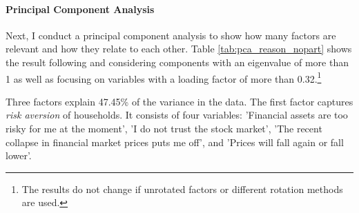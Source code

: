 \documentclass[ProjectABM]{subfiles}
\begin{document}





\paragraph{Principal Component Analysis}

Next, I conduct a principal component analysis to show how many factors are relevant and how they relate to each other. Table \ref{tab:pca_reason_nopart} shows the result following \cite{choi_2020} and\cite{tabachnick_fidell_2007} considering components with an eigenvalue of more than 1 as well as focusing on variables with a loading factor of more than 0.32.\footnote{The results do not change if unrotated factors or different rotation methods are used.}

Three factors explain 47.45\% of the variance in the data. The first factor captures \textit{risk aversion} of households. It consists of four variables: 'Financial assets are too risky for me at the moment', 'I do not trust the stock market', 'The recent collapse in financial market prices puts me off', and 'Prices will fall again or fall lower'. 
\end{document}

